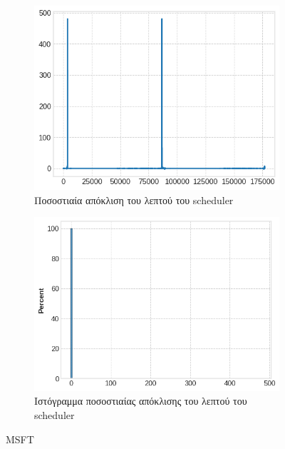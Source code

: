 \documentclass[12pt, a4paper]{article}
\begin{document}
\begin{figure}[h!]
  \begin{subfigure}[b]{0.45\textwidth}
    \centering
    \includegraphics[width=\textwidth]{delay_candlestick_line_msft.png}
    \caption{Ποσοστιαία απόκλιση του λεπτού του scheduler}
    \label{fig:sub3}
  \end{subfigure}
  \hfill
  \begin{subfigure}[b]{0.45\textwidth}
    \centering
    \includegraphics[width=\textwidth]{delay_candlestick_hist_msft.png}
    \caption{Ιστόγραμμα ποσοστιαίας απόκλισης του λεπτού του scheduler}
  \end{subfigure}
  
  \caption{MSFT}
\end{figure}
\end{document}
